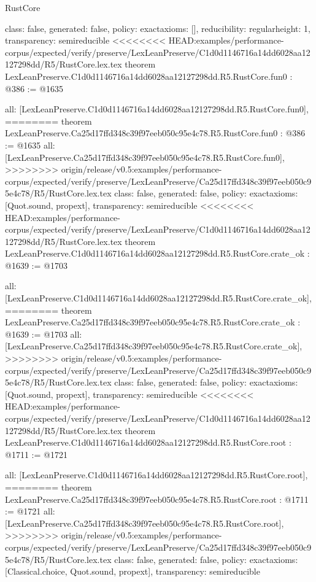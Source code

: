 \begin{lexlean}{RustCore}
\begin{coremodule}
{\begin{coremodule}
{{{  class: false,
  generated: false,
  policy: exact{axioms: []},
  reducibility: regular{height: 1},
  transparency: semireducible
}
<<<<<<<< HEAD:examples/performance-corpus/expected/verify/preserve/LexLeanPreserve/C1d0d1146716a14dd6028aa12127298dd/R5/RustCore.lex.tex
theorem LexLeanPreserve.C1d0d1146716a14dd6028aa12127298dd.R5.RustCore.fun0 : @386 := @1635 {
  all: [LexLeanPreserve.C1d0d1146716a14dd6028aa12127298dd.R5.RustCore.fun0],
========
theorem LexLeanPreserve.Ca25d17ffd348c39f97eeb050c95e4c78.R5.RustCore.fun0 : @386 := @1635 {
  all: [LexLeanPreserve.Ca25d17ffd348c39f97eeb050c95e4c78.R5.RustCore.fun0],
>>>>>>>> origin/release/v0.5:examples/performance-corpus/expected/verify/preserve/LexLeanPreserve/Ca25d17ffd348c39f97eeb050c95e4c78/R5/RustCore.lex.tex
  class: false,
  generated: false,
  policy: exact{axioms: [Quot.sound, propext]},
  transparency: semireducible
}
<<<<<<<< HEAD:examples/performance-corpus/expected/verify/preserve/LexLeanPreserve/C1d0d1146716a14dd6028aa12127298dd/R5/RustCore.lex.tex
theorem LexLeanPreserve.C1d0d1146716a14dd6028aa12127298dd.R5.RustCore.crate_ok : @1639 := @1703 {
  all: [LexLeanPreserve.C1d0d1146716a14dd6028aa12127298dd.R5.RustCore.crate_ok],
========
theorem LexLeanPreserve.Ca25d17ffd348c39f97eeb050c95e4c78.R5.RustCore.crate_ok : @1639 := @1703 {
  all: [LexLeanPreserve.Ca25d17ffd348c39f97eeb050c95e4c78.R5.RustCore.crate_ok],
>>>>>>>> origin/release/v0.5:examples/performance-corpus/expected/verify/preserve/LexLeanPreserve/Ca25d17ffd348c39f97eeb050c95e4c78/R5/RustCore.lex.tex
  class: false,
  generated: false,
  policy: exact{axioms: [Quot.sound, propext]},
  transparency: semireducible
}
<<<<<<<< HEAD:examples/performance-corpus/expected/verify/preserve/LexLeanPreserve/C1d0d1146716a14dd6028aa12127298dd/R5/RustCore.lex.tex
theorem LexLeanPreserve.C1d0d1146716a14dd6028aa12127298dd.R5.RustCore.root : @1711 := @1721 {
  all: [LexLeanPreserve.C1d0d1146716a14dd6028aa12127298dd.R5.RustCore.root],
========
theorem LexLeanPreserve.Ca25d17ffd348c39f97eeb050c95e4c78.R5.RustCore.root : @1711 := @1721 {
  all: [LexLeanPreserve.Ca25d17ffd348c39f97eeb050c95e4c78.R5.RustCore.root],
>>>>>>>> origin/release/v0.5:examples/performance-corpus/expected/verify/preserve/LexLeanPreserve/Ca25d17ffd348c39f97eeb050c95e4c78/R5/RustCore.lex.tex
  class: false,
  generated: false,
  policy: exact{axioms: [Classical.choice, Quot.sound, propext]},
  transparency: semireducible
}

}}}}}
\end{coremodule}}
\end{coremodule}
\end{lexlean}
